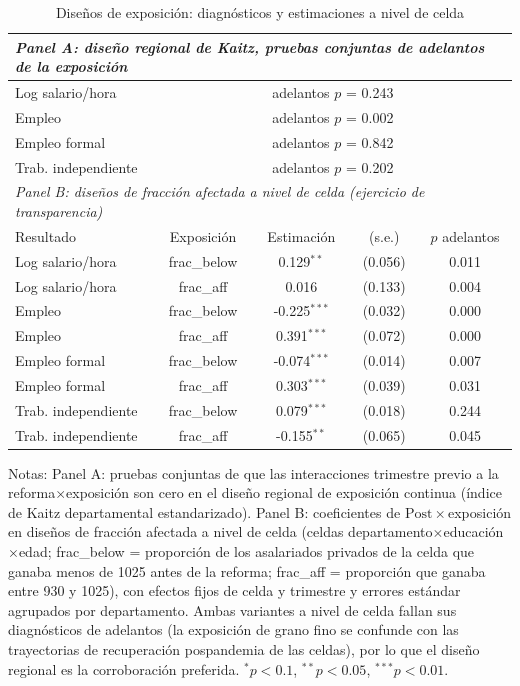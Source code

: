 \begin{table}[!tbp]\centering
\caption{Diseños de exposición: diagnósticos y estimaciones a nivel de celda}\label{tab:expocells}
\begin{threeparttable}
\footnotesize
\begin{tabular}{lcccc}
\toprule
\multicolumn{5}{l}{\emph{Panel A: diseño regional de Kaitz, pruebas conjuntas de adelantos de la exposición}} \\
\midrule
Log salario/hora & \multicolumn{4}{c}{adelantos $p$ = 0.243} \\
Empleo & \multicolumn{4}{c}{adelantos $p$ = 0.002} \\
Empleo formal & \multicolumn{4}{c}{adelantos $p$ = 0.842} \\
Trab. independiente & \multicolumn{4}{c}{adelantos $p$ = 0.202} \\
\midrule
\multicolumn{5}{l}{\emph{Panel B: diseños de fracción afectada a nivel de celda (ejercicio de transparencia)}} \\
Resultado & Exposición & Estimación & (s.e.) & $p$ adelantos \\ \midrule
Log salario/hora & frac\_below & 0.129$^{**}$ & (0.056) & 0.011 \\
Log salario/hora & frac\_aff & 0.016 & (0.133) & 0.004 \\
Empleo & frac\_below & -0.225$^{***}$ & (0.032) & 0.000 \\
Empleo & frac\_aff & 0.391$^{***}$ & (0.072) & 0.000 \\
Empleo formal & frac\_below & -0.074$^{***}$ & (0.014) & 0.007 \\
Empleo formal & frac\_aff & 0.303$^{***}$ & (0.039) & 0.031 \\
Trab. independiente & frac\_below & 0.079$^{***}$ & (0.018) & 0.244 \\
Trab. independiente & frac\_aff & -0.155$^{**}$ & (0.065) & 0.045 \\
\bottomrule
\end{tabular}
\begin{tablenotes}\footnotesize
\item Notas: Panel A: pruebas conjuntas de que las interacciones trimestre previo a la reforma$\times$exposición son cero en el diseño regional de exposición continua (índice de Kaitz departamental estandarizado). Panel B: coeficientes de $\mathrm{Post}\times$exposición en diseños de fracción afectada a nivel de celda (celdas departamento$\times$educación$\times$edad; frac\_below = proporción de los asalariados privados de la celda que ganaba menos de 1025 antes de la reforma; frac\_aff = proporción que ganaba entre 930 y 1025), con efectos fijos de celda y trimestre y errores estándar agrupados por departamento. Ambas variantes a nivel de celda fallan sus diagnósticos de adelantos (la exposición de grano fino se confunde con las trayectorias de recuperación pospandemia de las celdas), por lo que el diseño regional es la corroboración preferida. $^{*}p<0.1$, $^{**}p<0.05$, $^{***}p<0.01$.
\end{tablenotes}
\end{threeparttable}\end{table}
